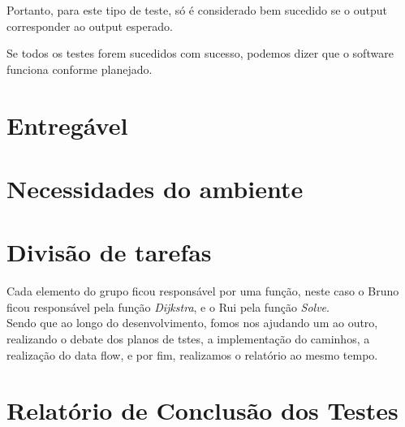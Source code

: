\documentclass{article}
\begin{document}
Portanto, para este tipo de teste, só é considerado bem sucedido se o output corresponder ao output esperado.

Se todos os testes forem sucedidos com sucesso, podemos dizer que o software funciona conforme planejado.
\section{Entregável}

\section{Necessidades do ambiente}



\section{Divisão de tarefas}

\quad Cada elemento do grupo ficou responsável por uma função, neste caso o Bruno ficou responsável pela função \textit{Dijkstra}, e o Rui pela função \textit{Solve}.\\

Sendo que ao longo do desenvolvimento, fomos nos ajudando um ao outro, realizando o debate dos planos de tstes, a implementação do caminhos, a realização do data flow, e por fim, realizamos o relatório ao mesmo tempo. 

\section{Relatório de Conclusão dos Testes}
\end{document}
